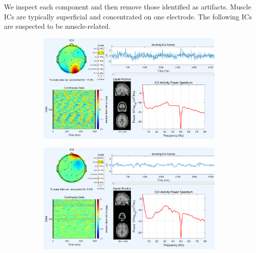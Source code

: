 \documentclass[hidelinks,12pt]{article}
\begin{document}
		We inspect each component and then remove those identified as artifacts. Muscle ICs are typically superficial and concentrated on one electrode. The following ICs are suspected to be muscle-related.
		
		\begin{figure}[!h]
			\centering
			\begin{subfigure}{0.45\textwidth}
				\centering
				\includegraphics[width=\linewidth]{hc/2}
			\end{subfigure}
			\hfill
			\begin{subfigure}{0.45\textwidth}
				\centering
				\includegraphics[width=\linewidth]{hc/4}
			\end{subfigure}
		\end{figure}
		
		\newpage
\end{document}
